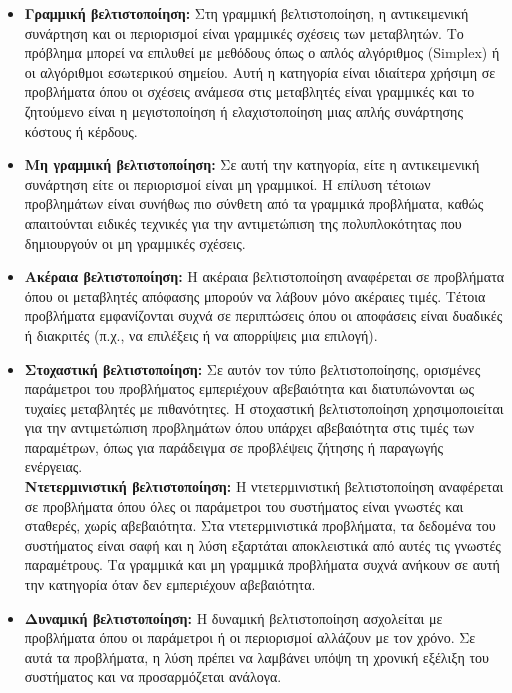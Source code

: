\begin{itemize}
    \item \textbf{Γραμμική βελτιστοποίηση:} Στη γραμμική βελτιστοποίηση, η αντικειμενική συνάρτηση και οι περιορισμοί είναι γραμμικές σχέσεις των μεταβλητών. Το πρόβλημα μπορεί να επιλυθεί με μεθόδους όπως ο απλός αλγόριθμος (Simplex) ή οι αλγόριθμοι εσωτερικού σημείου. Αυτή η κατηγορία είναι ιδιαίτερα χρήσιμη σε προβλήματα όπου οι σχέσεις ανάμεσα στις μεταβλητές είναι γραμμικές και το ζητούμενο είναι η μεγιστοποίηση ή ελαχιστοποίηση μιας απλής συνάρτησης κόστους ή κέρδους.
    \\
    \item \textbf{Μη γραμμική βελτιστοποίηση:} Σε αυτή την κατηγορία, είτε η αντικειμενική συνάρτηση είτε οι περιορισμοί είναι μη γραμμικοί. Η επίλυση τέτοιων προβλημάτων είναι συνήθως πιο σύνθετη από τα γραμμικά προβλήματα, καθώς απαιτούνται ειδικές τεχνικές για την αντιμετώπιση της πολυπλοκότητας που δημιουργούν οι μη γραμμικές σχέσεις.
    \\
    \item \textbf{Ακέραια βελτιστοποίηση:} Η ακέραια βελτιστοποίηση αναφέρεται σε προβλήματα όπου οι μεταβλητές απόφασης μπορούν να λάβουν μόνο ακέραιες τιμές. Τέτοια προβλήματα εμφανίζονται συχνά σε περιπτώσεις όπου οι αποφάσεις είναι δυαδικές ή διακριτές (π.χ., να επιλέξεις ή να απορρίψεις μια επιλογή).
    \\
    \item \textbf{Στοχαστική βελτιστοποίηση:} Σε αυτόν τον τύπο βελτιστοποίησης, ορισμένες παράμετροι του προβλήματος εμπεριέχουν αβεβαιότητα και διατυπώνονται ως τυχαίες μεταβλητές με πιθανότητες. Η στοχαστική βελτιστοποίηση χρησιμοποιείται για την αντιμετώπιση προβλημάτων όπου υπάρχει αβεβαιότητα στις τιμές των παραμέτρων, όπως για παράδειγμα σε προβλέψεις ζήτησης ή παραγωγής ενέργειας.
    \\
    \textbf{Ντετερμινιστική βελτιστοποίηση:} Η ντετερμινιστική βελτιστοποίηση αναφέρεται σε προβλήματα όπου όλες οι παράμετροι του συστήματος είναι γνωστές και σταθερές, χωρίς αβεβαιότητα. Στα ντετερμινιστικά προβλήματα, τα δεδομένα του συστήματος είναι σαφή και η λύση εξαρτάται αποκλειστικά από αυτές τις γνωστές παραμέτρους. Τα γραμμικά και μη γραμμικά προβλήματα συχνά ανήκουν σε αυτή την κατηγορία όταν δεν εμπεριέχουν αβεβαιότητα.
    \\
    \item \textbf{Δυναμική βελτιστοποίηση:} Η δυναμική βελτιστοποίηση ασχολείται με προβλήματα όπου οι παράμετροι ή οι περιορισμοί αλλάζουν με τον χρόνο. Σε αυτά τα προβλήματα, η λύση πρέπει να λαμβάνει υπόψη τη χρονική εξέλιξη του συστήματος και να προσαρμόζεται ανάλογα.
\end{itemize}

